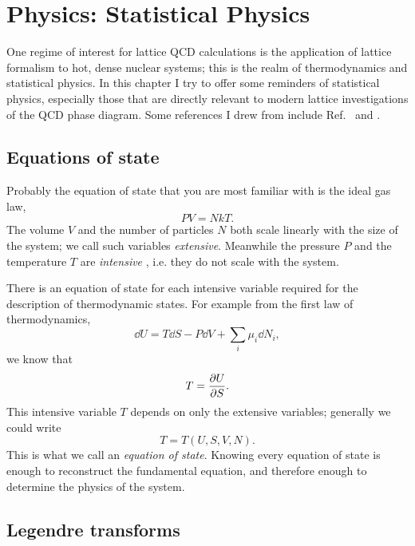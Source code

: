 \chapter{Physics: Statistical Physics}

One regime of interest for lattice QCD calculations is the application
of lattice formalism to hot, dense nuclear systems; this is the realm
of thermodynamics and statistical physics. In this chapter I try to
offer some reminders of statistical physics, especially those that
are directly relevant to modern lattice investigations of the QCD
phase diagram. Some references I drew from include
Ref.~\cite{tahir-kheli_general_2012} and \cite{kardar_statistical_2007}.

\section{Equations of state}\label{sec:EoS}


Probably the equation of state that you are most familiar with is the 
ideal gas law,
\begin{equation}
  PV=NkT.
\end{equation}
The volume $V$ and the number of particles $N$ both scale linearly with the
size of the system; we call such variables {\it extensive}. 
Meanwhile the pressure $P$ and the temperature $T$ are {\it intensive}
, i.e. they do not scale with the system.

There is an equation of state for each intensive variable required for the
description of thermodynamic states. For example from the
first law of thermodynamics,
\begin{equation}\label{eq:fslaw}
  \dd{U}=T\dd{S}-P\dd{V}+\sum_i\mu_i\dd{N}_i,
\end{equation}
we know that
\begin{equation}
  T=\pder[U]{S}.
\end{equation}
This intensive variable $T$ depends on only the extensive variables; 
generally we could write
\begin{equation}
  T=T(U,S,V,N).
\end{equation}
This is what we call an {\it equation of state}. 
Knowing every equation 
of state is enough to reconstruct the fundamental equation, and therefore 
enough to determine the physics of the system.

\section{Legendre transforms}

